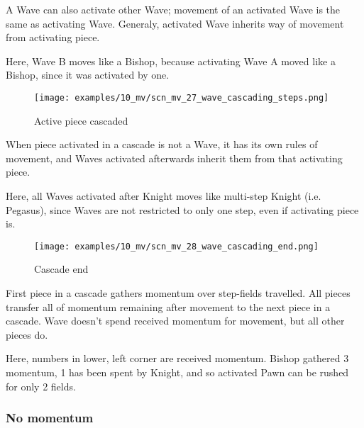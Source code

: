 A Wave can also activate other Wave; movement of an activated Wave is the same as
activating Wave. Generaly, activated Wave inherits way of movement from activating
piece.

Here, Wave B moves like a Bishop, because activating Wave A moved like a Bishop,
since it was activated by one.

\clearpage %

\vspace*{-2.1\baselineskip}
\noindent
\begin{figure}[h]
\texttt{[image: examples/10\_mv/scn\_mv\_27\_wave\_cascading\_steps.png]}
\caption{Active piece cascaded}
\label{fig:scn_mv_27_wave_cascading_steps}
\end{figure}

When piece activated in a cascade is not a Wave, it has its own rules of movement, and
Waves activated afterwards inherit them from that activating piece.

Here, all Waves activated after Knight moves like multi-step Knight (i.e. Pegasus),
since Waves are not restricted to only one step, even if activating piece is.

\clearpage %

\vspace*{-2.1\baselineskip}
\noindent
\begin{figure}[h]
\texttt{[image: examples/10\_mv/scn\_mv\_28\_wave\_cascading\_end.png]}
\vspace*{-1.3\baselineskip}
\caption{Cascade end}
\label{fig:scn_mv_28_wave_cascading_end}
\end{figure}

\vspace*{-0.3\baselineskip}
First piece in a cascade gathers momentum over step-fields travelled. All pieces
transfer all of momentum remaining after movement to the next piece in a cascade.
Wave doesn't spend received momentum for movement, but all other pieces do.

Here, numbers in lower, left corner are received momentum. Bishop gathered 3 momentum,
1 has been spent by Knight, and so activated Pawn can be rushed for only 2 fields.

\clearpage %

\subsubsection*{No momentum}
\label{sec:Miranda's veil/Wave/Cascading Waves/No momentum}

